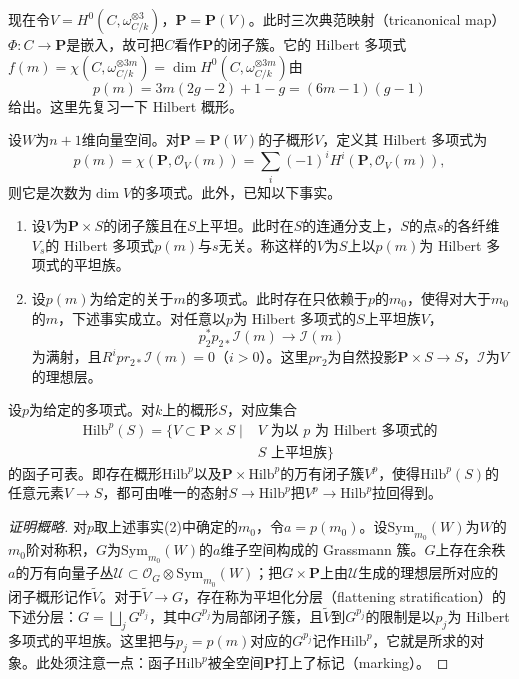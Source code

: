
现在令$V=H^0(C,\omega_{C/k}^{\otimes3})$，$\mathbf{P}=\mathbf{P}(V)$。此时三次典范映射（tricanonical map）$\Phi:C\to\mathbf{P}$是嵌入，故可把$C$看作$\mathbf{P}$的闭子簇。它的 Hilbert 多项式$f(m)=\chi(C,\omega_{C/k}^{\otimes3m})=\dim H^0(C,\omega_{C/k}^{\otimes3m})$由
\[
p(m)=3m(2g-2)+1-g=(6m-1)(g-1)
\]
给出。这里先复习一下 Hilbert 概形。

设$W$为$n+1$维向量空间。对$\mathbf{P}=\mathbf{P}(W)$的子概形$V$，定义其 Hilbert 多项式为
\[
p(m)=\chi(\mathbf{P},\mathcal{O}_V(m))=\sum_i(-1)^iH^i(\mathbf{P},\mathcal{O}_V(m)),
\]
则它是次数为$\dim V$的多项式。此外，已知以下事实。

\begin{enumerate}[label=(\arabic*)]
\item 设$V$为$\mathbf{P}\times S$的闭子簇且在$S$上平坦。此时在$S$的连通分支上，$S$的点$s$的各纤维$V_s$的 Hilbert 多项式$p(m)$与$s$无关。称这样的$V$为$S$上以$p(m)$为 Hilbert 多项式的平坦族。
\item 设$p(m)$为给定的关于$m$的多项式。此时存在只依赖于$p$的$m_0$，使得对大于$m_0$的$m$，下述事实成立。对任意以$p$为 Hilbert 多项式的$S$上平坦族$V$，
\[
p_2^*p_{2*}\mathcal{I}(m)\longrightarrow\mathcal{I}(m)
\]
为满射，且$R^ipr_{2*}\mathcal{I}(m)=0$（$i>0$）。这里$pr_2$为自然投影$\mathbf{P}\times S\to S$，$\mathcal{I}$为$V$的理想层。
\end{enumerate}


\begin{theorem}[Grothendieck]
设$p$为给定的多项式。对$k$上的概形$S$，对应集合
\begin{align*}
\mathrm{Hilb}^p(S)=\{V\subset\mathbf{P}\times S\mid{}&V\text{ 为以 }p\text{ 为 Hilbert 多项式的}\\
& S\text{ 上平坦族}\}
\end{align*}
的函子可表。即存在概形$\mathrm{Hilb}^p$以及$\mathbf{P}\times\mathrm{Hilb}^p$的万有闭子簇$V^p$，使得$\mathrm{Hilb}^p(S)$的任意元素$V\to S$，都可由唯一的态射$S\to\mathrm{Hilb}^p$把$V^p\to\mathrm{Hilb}^p$拉回得到。
\end{theorem}

\begin{proof}[证明概略]
对$p$取上述事实(2)中确定的$m_0$，令$a=p(m_0)$。设$\mathrm{Sym}_{m_0}(W)$为$W$的$m_0$阶对称积，$G$为$\mathrm{Sym}_{m_0}(W)$的$a$维子空间构成的 Grassmann 簇。$G$上存在余秩$a$的万有向量子丛$\mathcal{U}\subset\mathcal{O}_G\otimes\mathrm{Sym}_{m_0}(W)$；把$G\times\mathbf{P}$上由$\mathcal{U}$生成的理想层所对应的闭子概形记作$\tilde V$。对于$\tilde V\to G$，存在称为平坦化分层（flattening stratification）的下述分层：$G=\bigsqcup_jG^{p_j}$，其中$G^{p_j}$为局部闭子簇，且$\tilde V$到$G^{p_j}$的限制是以$p_j$为 Hilbert 多项式的平坦族。这里把与$p_j=p(m)$对应的$G^{p_j}$记作$\mathrm{Hilb}^p$，它就是所求的对象。此处须注意一点：函子$\mathrm{Hilb}^p$被全空间$\mathbf{P}$打上了标记（marking）。
\end{proof}

